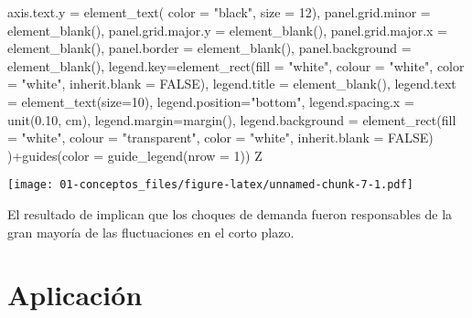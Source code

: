 \documentclass[
]{book}
\newenvironment{Shaded}{\begin{snugshade}}{\end{snugshade}}
\newcommand{\AttributeTok}[1]{\textcolor[rgb]{0.77,0.63,0.00}{#1}}
\newcommand{\ConstantTok}[1]{\textcolor[rgb]{0.00,0.00,0.00}{#1}}
\newcommand{\DecValTok}[1]{\textcolor[rgb]{0.00,0.00,0.81}{#1}}
\newcommand{\FloatTok}[1]{\textcolor[rgb]{0.00,0.00,0.81}{#1}}
\newcommand{\FunctionTok}[1]{\textcolor[rgb]{0.00,0.00,0.00}{#1}}
\newcommand{\NormalTok}[1]{#1}
\newcommand{\SpecialCharTok}[1]{\textcolor[rgb]{0.00,0.00,0.00}{#1}}
\newcommand{\StringTok}[1]{\textcolor[rgb]{0.31,0.60,0.02}{#1}}
\begin{document}
\begin{Shaded}
\begin{Highlighting}[]
           \AttributeTok{axis.text.y =} \FunctionTok{element\_text}\NormalTok{( }\AttributeTok{color =} \StringTok{"black"}\NormalTok{, }\AttributeTok{size =} \DecValTok{12}\NormalTok{),}
           \AttributeTok{panel.grid.minor =} \FunctionTok{element\_blank}\NormalTok{(),}
           \AttributeTok{panel.grid.major.y =} \FunctionTok{element\_blank}\NormalTok{(),}
           \AttributeTok{panel.grid.major.x =} \FunctionTok{element\_blank}\NormalTok{(),}
           \AttributeTok{panel.border =} \FunctionTok{element\_blank}\NormalTok{(),}
           \AttributeTok{panel.background =} \FunctionTok{element\_blank}\NormalTok{(),}
           \AttributeTok{legend.key=}\FunctionTok{element\_rect}\NormalTok{(}\AttributeTok{fill =} \StringTok{"white"}\NormalTok{, }\AttributeTok{colour =} \StringTok{"white"}\NormalTok{,}
                                   \AttributeTok{color =} \StringTok{"white"}\NormalTok{, }\AttributeTok{inherit.blank =} \ConstantTok{FALSE}\NormalTok{),}
           \AttributeTok{legend.title =} \FunctionTok{element\_blank}\NormalTok{(),}
           \AttributeTok{legend.text  =} \FunctionTok{element\_text}\NormalTok{(}\AttributeTok{size=}\DecValTok{10}\NormalTok{),}
           \AttributeTok{legend.position=}\StringTok{"bottom"}\NormalTok{,}
           \AttributeTok{legend.spacing.x =} \FunctionTok{unit}\NormalTok{(}\FloatTok{0.10}\NormalTok{, }\StringTok{\textquotesingle{}cm\textquotesingle{}}\NormalTok{),}
           \AttributeTok{legend.margin=}\FunctionTok{margin}\NormalTok{(),}
           \AttributeTok{legend.background =} \FunctionTok{element\_rect}\NormalTok{(}\AttributeTok{fill =} \StringTok{"white"}\NormalTok{, }\AttributeTok{colour =} \StringTok{"transparent"}\NormalTok{,}
                                            \AttributeTok{color =} \StringTok{"white"}\NormalTok{, }\AttributeTok{inherit.blank =} \ConstantTok{FALSE}\NormalTok{)}
\NormalTok{)}\SpecialCharTok{+}\FunctionTok{guides}\NormalTok{(}\AttributeTok{color =} \FunctionTok{guide\_legend}\NormalTok{(}\AttributeTok{nrow =} \DecValTok{1}\NormalTok{))}
\NormalTok{Z}
\end{Highlighting}
\end{Shaded}

\texttt{[image: 01-conceptos\_files/figure-latex/unnamed-chunk-7-1.pdf]}

El resultado de \citet{BLANCHARD88} implican que los choques de demanda fueron responsables de la gran mayoría de las fluctuaciones en el corto plazo.

\hypertarget{aplicaciuxf3n-gali99}{%
\section{\texorpdfstring{Aplicación \citet{GALI99}}{Aplicación @GALI99}}\label{aplicaciuxf3n-gali99}}
\end{document}
